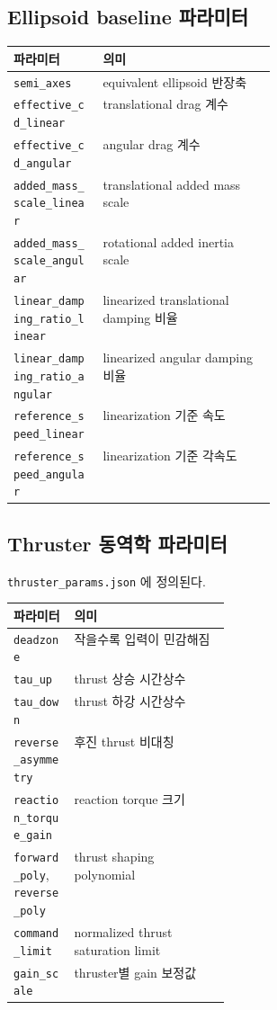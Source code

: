 \documentclass[11pt,a4paper]{article}
\newcommand{\code}[1]{\nolinkurl{#1}}
\begin{document}
\subsection{Ellipsoid baseline 파라미터}

\begin{center}
\small
\begin{tabularx}{\linewidth}{>{\raggedright\arraybackslash}p{0.34\linewidth}Y}
\toprule
파라미터 & 의미 \\
\midrule
\code{semi_axes} & equivalent ellipsoid 반장축 \\
\code{effective_cd_linear} & translational drag 계수 \\
\code{effective_cd_angular} & angular drag 계수 \\
\code{added_mass_scale_linear} & translational added mass scale \\
\code{added_mass_scale_angular} & rotational added inertia scale \\
\code{linear_damping_ratio_linear} & linearized translational damping 비율 \\
\code{linear_damping_ratio_angular} & linearized angular damping 비율 \\
\code{reference_speed_linear} & linearization 기준 속도 \\
\code{reference_speed_angular} & linearization 기준 각속도 \\
\bottomrule
\end{tabularx}
\end{center}

\subsection{Thruster 동역학 파라미터}

\texttt{thruster\_params.json} 에 정의된다.

\begin{center}
\small
\begin{tabularx}{\linewidth}{>{\raggedright\arraybackslash}p{0.28\linewidth}Y}
\toprule
파라미터 & 의미 \\
\midrule
\code{deadzone} & 작을수록 입력이 민감해짐 \\
\code{tau_up} & thrust 상승 시간상수 \\
\code{tau_down} & thrust 하강 시간상수 \\
\code{reverse_asymmetry} & 후진 thrust 비대칭 \\
\code{reaction_torque_gain} & reaction torque 크기 \\
\code{forward_poly}, \code{reverse_poly} & thrust shaping polynomial \\
\code{command_limit} & normalized thrust saturation limit \\
\code{gain_scale} & thruster별 gain 보정값 \\
\bottomrule
\end{tabularx}
\end{center}
\end{document}
